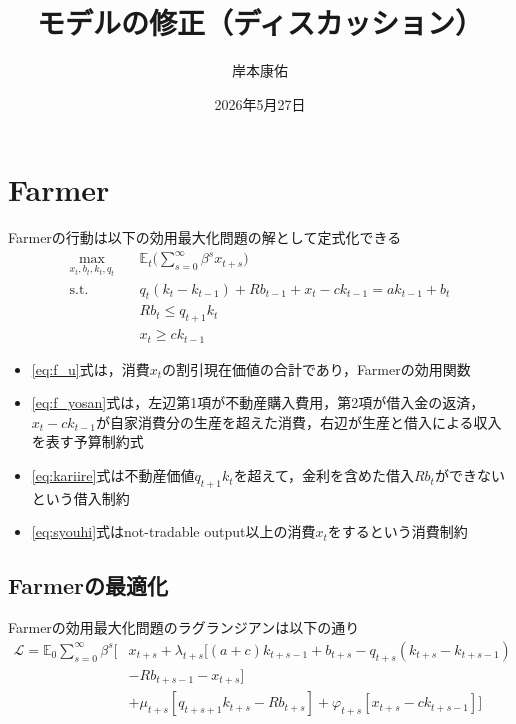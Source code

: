 \documentclass[dvipdfmx]{jlreq}
\title{
\vspace{-4cm}
モデルの修正（ディスカッション）
}
\author{岸本康佑}
\date{2026年5月27日}
\begin{document}
\maketitle
\tableofcontents

\section{Farmer}
Farmerの行動は以下の効用最大化問題の解として定式化できる
\begin{align}
  \max_{x_t, b_t, k_t, q_t} \quad & \mathbb{E}_t \bigg( \sum_{s=0}^{\infty} \beta^s x_{t+s} \bigg) \label{eq:f_u} \\
  \text{s.t.} \quad & q_t(k_t - k_{t-1}) + R b_{t-1} + x_t - c k_{t-1} = a k_{t-1} + b_t \label{eq:f_yosan} \\
  & R b_t \leq q_{t+1} k_t \label{eq:kariire}\\
  & x_t \geq c k_{t-1} \label{eq:syouhi}
\end{align}

\begin{itemize}
  \item \eqref{eq:f_u}式は，消費$x_t$の割引現在価値の合計であり，Farmerの効用関数
  \item \eqref{eq:f_yosan}式は，左辺第1項が不動産購入費用，第2項が借入金の返済，$x_t-ck_{t-1}$が自家消費分の生産を超えた消費，右辺が生産と借入による収入を表す予算制約式
  \item \eqref{eq:kariire}式は不動産価値$q_{t+1} k_t$を超えて，金利を含めた借入$R b_t$ができないという借入制約
  \item \eqref{eq:syouhi}式はnot-tradable output以上の消費$x_t$をするという消費制約
\end{itemize}

\subsection{Farmerの最適化}
Farmerの効用最大化問題のラグランジアンは以下の通り
\begin{equation}
  \begin{aligned}
    \mathcal{L} = \mathbb{E}_0 \sum_{s=0}^{\infty} \beta^s \bigg[ & x_{t+s} + \lambda_{t+s} [(a + c) k_{t+s-1} + b_{t+s} - q_{t+s} (k_{t+s} - k_{t+s-1}) \\
    &- R b_{t+s-1} - x_{t+s}] \\
    &+\mu_{t+s}[q_{t+s+1}k_{t+s} - R b_{t+s}] + \varphi_{t+s}[x_{t+s} - ck_{t+s-1}] \bigg]
  \end{aligned}
\end{equation}
\end{document}
